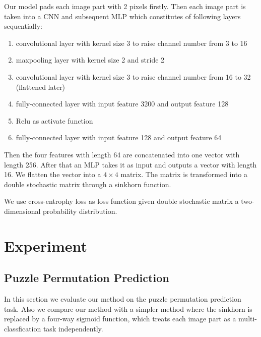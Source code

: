 \documentclass[twocolumn]{article}
\begin{document}
Our model pads each image part with 2 pixels firstly. Then each image part is taken into a CNN and 
subsequent MLP which constitutes of following layers sequentially: 
\begin{enumerate}
    \item convolutional layer with kernel size 3 to raise channel number from 3 to 16
    \item maxpooling layer with kernel size 2 and stride 2
    \item convolutional layer with kernel size 3 to raise channel number from 16 to 32 (flattened later)
    \item fully-connected layer with input feature 3200 and output feature 128
    \item Relu as activate function
    \item fully-connected layer with input feature 128 and output feature 64
\end{enumerate}
Then the four features with length 64 are concatenated into one vector with length 256. After that an MLP 
takes it as input and outputs a vector with length 16. We flatten the vector into a $4\times 4$ matrix. 
The matrix is transformed into a double stochastic matrix through a sinkhorn function. 

We use cross-entrophy loss as loss function given double stochastic matrix a two-dimensional probability 
distribution. 
\section{Experiment}
\subsection{Puzzle Permutation Prediction}
In this section we evaluate our method on the puzzle permutation prediction task. Also we compare 
our method with a simpler method where the sinkhorn is replaced by a four-way sigmoid function, which 
treats each image part as a multi-classfication task independently. 
\end{document}
